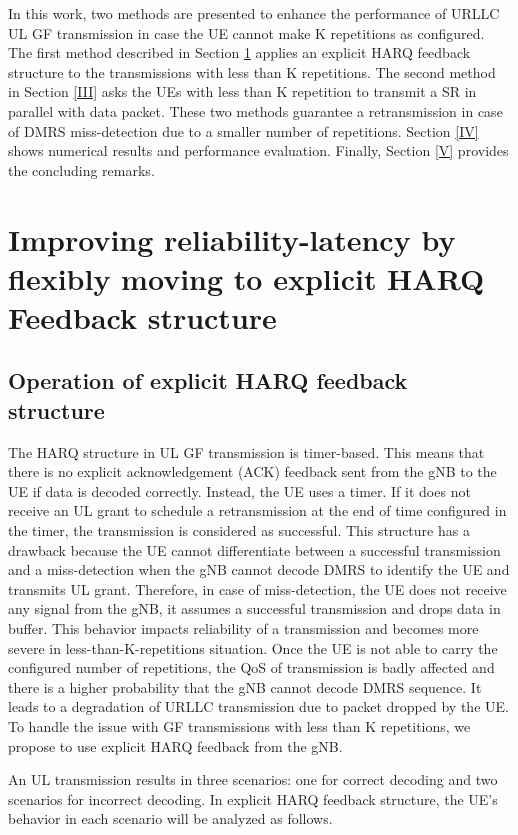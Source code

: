 \documentclass[conference]{IEEEtran}
\begin{document}
In this work, two methods are presented to enhance the performance of URLLC UL GF transmission in case the UE cannot make K repetitions as configured. The first method described in Section \ref{II} applies an explicit HARQ feedback structure to the transmissions with less than K repetitions. The second method in Section \ref{III} asks the UEs with less than K repetition to transmit a SR in parallel with data packet. These two methods guarantee a retransmission in case of DMRS miss-detection due to a smaller number of repetitions. Section \ref{IV} shows numerical results and performance evaluation. Finally, Section \ref{V} provides the concluding remarks.

\section{Improving reliability-latency by flexibly moving to explicit HARQ Feedback structure}\label{II}

\subsection{Operation of explicit HARQ feedback structure}\label{IIAA}

The HARQ structure in UL GF transmission is timer-based. This means that there is no explicit acknowledgement (ACK) feedback sent from the gNB to the UE if data is decoded correctly. Instead, the UE uses a timer. If it does not receive an UL grant to schedule a retransmission at the end of time configured in the timer, the transmission is considered as successful. This structure has a drawback because the UE cannot differentiate between a successful transmission and a miss-detection when the gNB cannot decode DMRS to identify the UE and transmits UL grant. Therefore, in case of miss-detection, the UE does not receive any signal from the gNB, it assumes a successful transmission and drops data in buffer. This behavior impacts reliability of a transmission and becomes more severe in less-than-K-repetitions situation. Once the UE is not able to carry the configured number of repetitions, the QoS of transmission is badly affected and there is a higher probability that the gNB cannot decode DMRS sequence. It leads to a degradation of URLLC transmission due to packet dropped by the UE. To handle the issue with GF transmissions with less than K repetitions, we propose to use explicit HARQ feedback from the gNB. 

An UL transmission results in three scenarios: one for correct decoding and two scenarios for incorrect decoding. In explicit HARQ feedback structure, the UE's behavior in each scenario will be analyzed as follows. 
\end{document}
